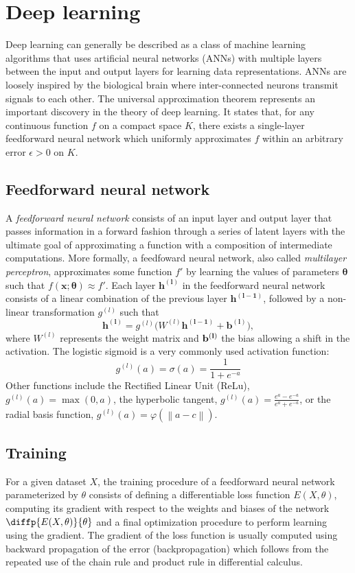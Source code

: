 \documentclass[bsc,frontabs,twoside,singlespacing,parskip,deptreport]{infthesis}     %
\begin{document}
\section{Deep learning}
Deep learning can generally be described as a class of machine learning algorithms that uses artificial neural networks (ANNs) with multiple layers between the input and output layers for learning data representations. ANNs are loosely inspired by the biological brain where inter-connected neurons transmit signals to each other.
The universal approximation theorem represents an important discovery in the theory of deep learning. It states that, for any continuous function \(f\) on a compact space \(K\), there exists a single-layer feedforward neural network which uniformly approximates \(f\) within an arbitrary error \(\epsilon>0\) on \(K\).
\subsection{Feedforward neural network}
A \textit{feedforward neural network} consists of an input layer and output layer that passes information in a forward fashion through a series of latent layers with the ultimate goal of approximating a function with a composition of intermediate computations. More formally, a feedfoward neural network, also called \textit{multilayer perceptron}, approximates some function \(f'\) by learning the values of parameters \(\boldsymbol{\theta}\) such that \(f(\boldsymbol{x} ; \boldsymbol{\theta}) \approx f'\).
Each layer \(\bm{h^{(l)}}\)  in the feedforward neural network consists of a linear combination of the previous layer \(\bm{h^{(l-1)}}\), followed by a non-linear transformation \(g^{(l)}\) such that \[\bm{h^{(l)}} = g^{(l)}(W^{(l)}\bm{h^{(l-1)}} + \bm{b^{(l)})},\]
where \(W^{(l)}\) represents the weight matrix and \(\bf{b^{(l)}}\) the bias allowing a shift in the activation. The logistic sigmoid is a very commonly used activation function: \[g^{(l)}(a) = \sigma(a) = \frac{1}{1+e^{-a}}\]
Other functions include the Rectified Linear Unit (ReLu), \(g^{(l)}(a)= \max(0, a)\), the hyperbolic tangent, \(g^{(l)}(a)={\frac {e^{a}-e^{-a}}{e^{a}+e^{-a}}}\), or the radial basis function, \(g^{(l)}(a)=\varphi (\left\|a -c \right\|)\).
\subsection{Training}
For a given dataset \(X\), the training procedure of a feedforward neural network parameterized by \(\theta\) consists of defining a differentiable loss function \(E(X,\theta)\), computing its gradient with respect to the weights and biases of the network \(\diffp{E(X,\theta)}{\theta}\) and a final optimization procedure to perform learning using the gradient.
The gradient of the loss function is usually computed using backward propagation of the error (backpropagation) which follows from the repeated use of the chain rule and product rule in differential calculus.  
\end{document}
